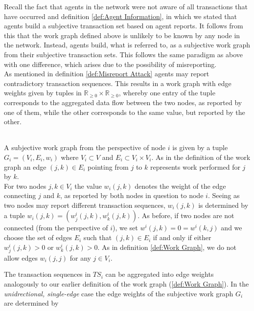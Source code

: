 \noindent{}Recall the fact that agents in the network were not aware of all transactions that have occurred and definition \ref{def:Agent Information}, in which we stated that agents build a subjective transaction set based on agent reports. It follows from this that the work graph defined above is unlikely to be known by any node in the network. Instead, agents build, what is referred to, as a subjective work graph from their subjective transaction sets. This follows the same paradigm as above with one difference, which arises due to the possibility of misreporting. \vspace{1em}\\

\noindent{}As mentioned in definition \ref{def:Misreport Attack} agents may report contradictory transaction sequences. This results in a work graph with edge weights given by tuples in $\mathbb{R}_{\geq{}0}\times\mathbb{R}_{\geq{}0}$, whereby one entry of the tuple corresponds to the aggregated data flow between the two nodes, as reported by one of them, while the other corresponds to the same value, but reported by the other. \vspace{1em}\\

\begin{definition}\ \\
\label{def:Subjective Work Graph}
\noindent{}A subjective work graph from the perspective of node $i$ is given by a tuple $G_i=(V_i,E_i,w_i)$ where $V_i\subset{}V$ and $E_i\subset{}V_i\times{}V_i$. As in the definition of the work graph an edge $(j,k)\in{}E_i$ pointing from $j$ to $k$ represents work performed for $j$ by $k$.\vspace{1em}\\

\noindent{}For two nodes $j,k\in{}V_i$ the value $w_i(j,k)$ denotes the weight of the edge connecting $j$ and $k$, as reported by both nodes in question to node $i$. Seeing as two nodes may report different transaction sequences, $w_i(j,k)$ is determined by a tuple $w_i(j,k) = (w_j^i(j,k), w_k^i(j,k))$. As before, if two nodes are not connected (from the perspective of $i$), we set $w^i(j,k)=0=w^i(k,j)$ and we choose the set of edges $E_i$ such that $(j,k)\in{}E_i$ if and only if either $w_j^i(j,k)>0$ or $w_k^i(j,k)>0$. As in definition \ref{def:Work Graph}, we do not allow edges $w_i(j,j)$ for any $j\in{}V_i$.
\end{definition}

\noindent{}The transaction sequences in $TS_i$ can be aggregated into edge weights analogously to our earlier definition of the work graph (\ref{def:Work Graph}). In the {\it unidrectional, single-edge} case the edge weights of the subjective work graph $G_i$ are determined by 

